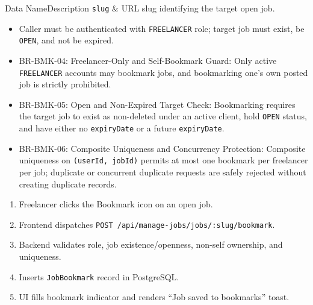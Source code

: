 
\begin{specdatatable}{Data Name}{Description}
\texttt{slug} & URL slug identifying the target open job.\\ \hline
\end{specdatatable}

\begin{itemize}[leftmargin=1.6em,topsep=3pt,itemsep=2pt,parsep=0pt,label=$\bullet$]
    \item Caller must be authenticated with \texttt{FREELANCER} role; target job must exist, be \texttt{OPEN}, and not be expired.
\end{itemize}

\begin{itemize}[leftmargin=1.6em,topsep=3pt,itemsep=2pt,parsep=0pt,label=$\bullet$]\brrulelist
    \item BR-BMK-04: Freelancer-Only and Self-Bookmark Guard: Only active \texttt{FREELANCER} accounts may bookmark jobs, and bookmarking one's own posted job is strictly prohibited.
    \item BR-BMK-05: Open and Non-Expired Target Check: Bookmarking requires the target job to exist as non-deleted under an active client, hold \texttt{OPEN} status, and have either no \texttt{expiryDate} or a future \texttt{expiryDate}.
    \item BR-BMK-06: Composite Uniqueness and Concurrency Protection: Composite uniqueness on \texttt{(userId, jobId)} permits at most one bookmark per freelancer per job; duplicate or concurrent duplicate requests are safely rejected without creating duplicate records.
\end{itemize}

\begin{enumerate}[leftmargin=1.8em,topsep=3pt,itemsep=2pt,parsep=0pt]
    \item Freelancer clicks the Bookmark icon on an open job.
    \item Frontend dispatches \texttt{POST /api/manage-jobs/jobs/:slug/bookmark}.
    \item Backend validates role, job existence/openness, non-self ownership, and uniqueness.
    \item Inserts \texttt{JobBookmark} record in PostgreSQL.
    \item UI fills bookmark indicator and renders ``Job saved to bookmarks'' toast.
\end{enumerate}

